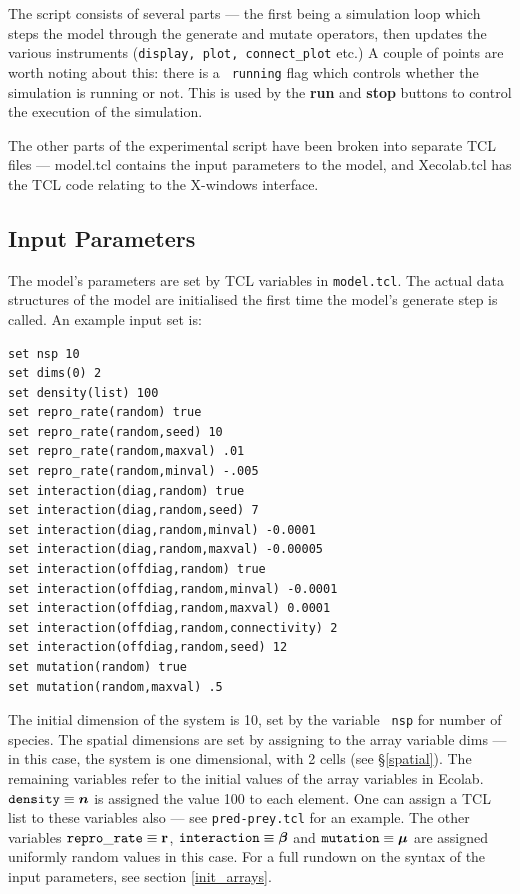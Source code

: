 The script consists of several parts --- the first being a simulation loop
which steps the model through the generate and mutate operators, then
updates the various instruments ({\tt display, plot, connect\_plot}
etc.) A couple of points are worth noting about this: there is a {\tt
  running} flag which controls whether the simulation is running or
not. This is used by the {\bf run} and {\bf stop} buttons to control
the execution of the simulation. 

The other parts of the experimental script have been broken into
separate TCL files --- model.tcl contains the input parameters to the
model, and Xecolab.tcl has the TCL code relating to the X-windows
interface.

\subsection{Input Parameters}\label{input parameters}

The model's parameters are set by TCL variables in {\tt model.tcl}.
The actual data structures of the model are initialised the first time
the model's generate step is called. An example input set is:
\begin{verbatim}
set nsp 10
set dims(0) 2
set density(list) 100
set repro_rate(random) true
set repro_rate(random,seed) 10
set repro_rate(random,maxval) .01
set repro_rate(random,minval) -.005
set interaction(diag,random) true
set interaction(diag,random,seed) 7
set interaction(diag,random,minval) -0.0001
set interaction(diag,random,maxval) -0.00005
set interaction(offdiag,random) true
set interaction(offdiag,random,minval) -0.0001
set interaction(offdiag,random,maxval) 0.0001
set interaction(offdiag,random,connectivity) 2
set interaction(offdiag,random,seed) 12
set mutation(random) true
set mutation(random,maxval) .5
\end{verbatim}
The initial dimension of the system is 10, set by the variable {\tt
  nsp} for number of species. The spatial dimensions are set by
assigning to the array variable dims --- in this case, the system is
one dimensional, with 2 cells (see \S\ref{spatial}). The
remaining variables refer to the initial values of the array variables
in Ecolab. ${\tt density}\equiv\mbox{\boldmath{$n$}}$ is assigned the value 100 to each
element. One can assign a TCL list to these variables also --- see
{\tt pred-prey.tcl} for an example. The other variables ${\tt
  repro\_rate}\equiv\mbox{${\bf r}$}$, ${\tt interaction}\equiv\mbox{\boldmath{$\beta$}}$ and ${\tt
  mutation}\equiv\mbox{\boldmath{$\mu$}}$ are assigned uniformly random values in this
case. For a full rundown on the syntax of the input parameters, see
section \ref{init_arrays}.


